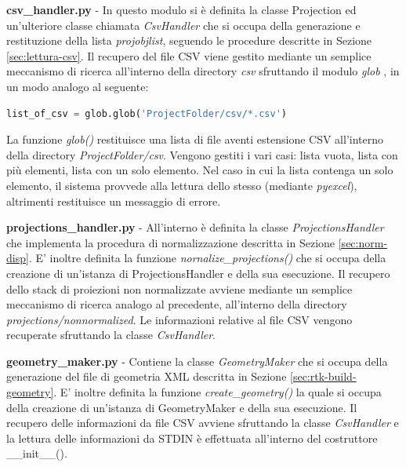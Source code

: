 \documentclass[a4paper,12pt, doubleside]{report}
\begin{document}
            \bigskip
            \par
                \textbf{csv\_handler.py} - In questo modulo si è definita la classe Projection ed un'ulteriore classe chiamata \textit{CsvHandler} che si occupa della generazione e restituzione della lista \textit{proj\textunderscore obj\textunderscore list}, seguendo le procedure descritte in Sezione \ref{sec:lettura-csv}. Il recupero del file CSV viene gestito mediante un semplice meccanismo di ricerca all'interno della directory \textit{csv} sfruttando il modulo \textit{glob} \cite{python-glob}, in un modo analogo al seguente:
                
                \begin{lstlisting}[language=python, frame=bt]
list_of_csv = glob.glob('ProjectFolder/csv/*.csv')
                \end{lstlisting}
                
                La funzione \textit{glob()} restituisce una lista di file aventi estensione CSV all'interno della directory \textit{ProjectFolder/csv}. Vengono gestiti i vari casi: lista vuota, lista con più elementi, lista con un solo elemento. Nel caso in cui la lista contenga un solo elemento, il sistema provvede alla lettura dello stesso (mediante \textit{pyexcel}), altrimenti restituisce un messaggio di errore.
                
            \bigskip
            \par
                \textbf{projections\_handler.py} - All'interno è definita la classe \textit{ProjectionsHandler} che implementa la procedura di normalizzazione descritta in Sezione \ref{sec:norm-disp}. E' inoltre definita la funzione \textit{nornalize\_projections()} che si occupa della creazione di un'istanza di ProjectionsHandler e della sua esecuzione. Il recupero dello stack di proiezioni non normalizzate avviene mediante un semplice meccanismo di ricerca analogo al precedente, all'interno della directory \textit{projections/non\textunderscore normalized}. Le informazioni relative al file CSV vengono recuperate sfruttando la classe \textit{CsvHandler}. 
                
            \bigskip
            \par
               \textbf{geometry\_maker.py} - Contiene la classe \textit{GeometryMaker} che si occupa della generazione del file di geometria XML descritta in Sezione \ref{sec:rtk-build-geometry}. E' inoltre definita la funzione \textit{create\_geometry()} la quale si occupa della creazione di un'istanza di GeometryMaker e della sua esecuzione. Il recupero delle informazioni da file CSV avviene sfruttando la classe \textit{CsvHandler} e la lettura delle informazioni da STDIN è effettuata all'interno del costruttore \_\_init\_\_().
            
\end{document}
